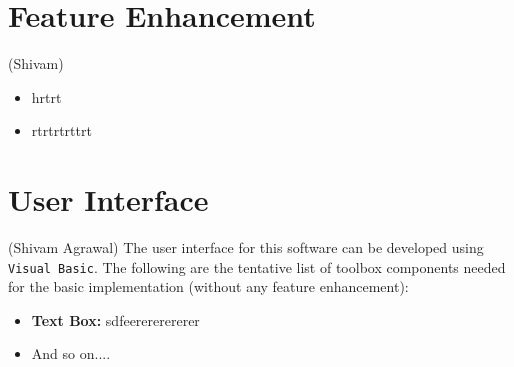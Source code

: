\documentclass[12pt,a4paper]{article}
\begin{document}
\section{Feature Enhancement}
(Shivam)
\begin{itemize}
    \item hrtrt
    \item rtrtrtrttrt
\end{itemize}
        
\section{User Interface}
(Shivam Agrawal)
	The user interface for this software can be developed using \texttt{Visual Basic}. The following are the tentative list of toolbox components needed for the basic implementation (without any feature enhancement):
    \begin{itemize}
        \item \textbf{Text Box:} sdfeerererererer
        \item And so on....
    \end{itemize}
\end{document}
